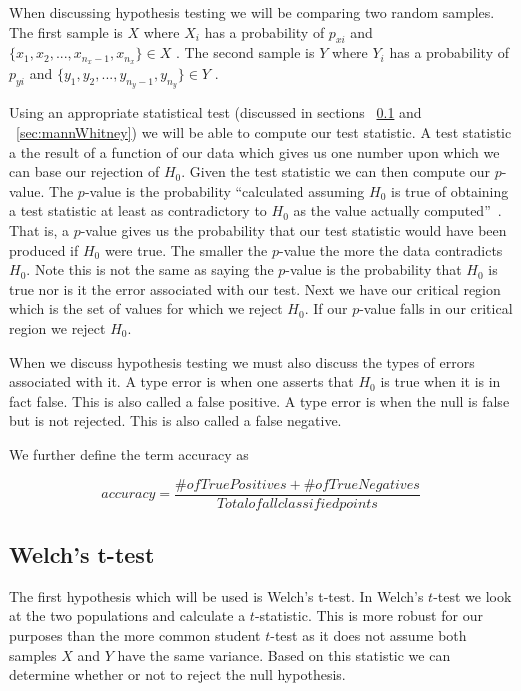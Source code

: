 When discussing hypothesis testing we will be comparing two random samples. The first sample is $X$ where  $X_i$ has a probability of  $p_{xi}$ and $\{x_1,x_2,...,x_{n_x-1} , x_{n_x}\} \in X$ . The second sample is $Y$ where  $Y_i$ has a probability of  $p_{yi}$ and $\{y_1,y_2,...,y_{n_y-1} , y_{n_y}\} \in Y$ .

Using an appropriate statistical test (discussed in sections ~\ref{sec:ttest} and ~\ref{sec:mannWhitney}) we will be able to compute our test statistic. A test statistic a the result of a function of our data which gives us one number upon which we can base our rejection of $H_0$. Given the test statistic we can then compute our $p$-value. The $p$-value is the probability ``calculated assuming $H_0$ is true of obtaining a test statistic at least as contradictory to $H_0$ as the value actually computed''~\cite{devore_probability_2011}. That is, a $p$-value gives us the probability that our test statistic would have been produced if $H_0$ were true. The smaller the $p$-value the more the data contradicts $H_0$. Note this is not the same as saying the $p$-value is the probability that $H_0$ is true nor is it the error associated with our test. Next we have our critical region which is the set of values for which we reject $H_0$. If our $p$-value falls in our critical region we reject $H_0$.

When we discuss hypothesis testing we must also discuss the types of errors associated with it. A type  error is when one asserts that $H_0$ is true when it is in fact false. This is also called a false positive. A type  error is when the null is false but is not rejected. This is also called a false negative. 

We further define the term accuracy as 

\begin{equation}\label{Accuracy}
	accuracy=\frac{\# of True Positives + \# of True Negatives}{Total of all classified points}
\end{equation}
\subsection{Welch's t-test}\label{sec:ttest}

The first hypothesis which will be used is Welch's t-test\cite{welch_generalization_1947}. In Welch's $t$-test we look at the two populations and calculate a $t$-statistic. This is more robust for our purposes than the more common student $t$-test as it does not assume both samples $X$ and $Y$ have the same variance. Based on this statistic we can determine whether or not to reject the null hypothesis.  

